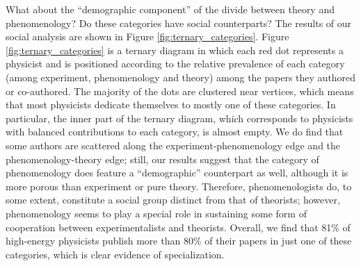\documentclass[smallextended]{svjour3}
\begin{document}
What about the ``demographic component'' of the divide between theory and phenomenology? Do these categories have social counterparts? The results of our social analysis are shown in Figure \ref{fig:ternary_categories}. %
Figure \ref{fig:ternary_categories} is a ternary diagram in which each red dot represents a physicist and is positioned according to the relative prevalence of each category (among experiment, phenomenology and theory) among the papers they authored or co-authored. The majority of the dots are clustered near vertices, which means that most physicists dedicate themselves to mostly one of these categories. In particular, the inner part of the ternary diagram, which corresponds to physicists with balanced contributions to each category, is almost empty. We do find that some authors are scattered along the experiment-phenomenology edge and the phenomenology-theory edge; still, our results suggest that the category of phenomenology does feature a ``demographic'' counterpart as well, although it is more porous than experiment or pure theory. Therefore, phenomenologists do, to some extent, constitute a social group distinct from that of theorists; however, phenomenology seems to play a special role in sustaining some form of cooperation between experimentalists and theorists. Overall, we find that 81\% of high-energy physicists publish more than 80\% of their papers in just one of these categories, which is clear evidence of specialization.

\begin{figure*}
    \centering
    \caption{\textbf{Relative fraction of articles from any of the categories ``Experiment'', ``Phenomenology'' and ``Theory'', for 2,500 \gls{hep} physicists.} Each physicist among those sampled is represented by a red dot on the diagram, positioned according to the estimate of $(p_{i,exp},p_{i,ph},p_{i,th})$, the probability that any of his articles belong to those three categories. The dashed lines, along the direction of the arrows, form a grid along which one can read the relative importance of each category for every physicist  ($p_{ij}\over \sum_{k}p_{ik}$). Physicists near the vertices of the triangle contribute almost exclusively to one category; those near an edge contribute quasi-exclusively to two categories. Most physicists are located near a vertex, thus contributing to mostly one category.}
    \label{fig:ternary_categories}
\end{figure*}
\end{document}
